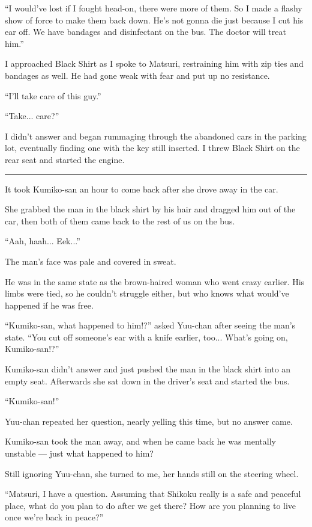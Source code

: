 ``I would've lost if I fought head-on, there were more of them. So I made a flashy show of force to make them back down. He's not gonna die just because I cut his ear off. We have bandages and disinfectant on the bus. The doctor will treat him.''

I approached Black Shirt as I spoke to Matsuri, restraining him with zip ties and bandages as well. He had gone weak with fear and put up no resistance.

``I'll take care of this guy.''

``Take... care?''

I didn't answer and began rummaging through the abandoned cars in the parking lot, eventually finding one with the key still inserted. I threw Black Shirt on the rear seat and started the engine.

\vspace{\baselineskip}
\hrule
\vspace{\baselineskip}

It took Kumiko-san an hour to come back after she drove away in the car.

She grabbed the man in the black shirt by his hair and dragged him out of the car, then both of them came back to the rest of us on the bus.

``Aah, haah... Eek...''

The man's face was pale and covered in sweat.

He was in the same state as the brown-haired woman who went crazy earlier. His limbs were tied, so he couldn't struggle either, but who knows what would've happened if he was free.

``Kumiko-san, what happened to him!?'' asked Yuu-chan after seeing the man's state.  ``You cut off someone's ear with a knife earlier, too... What's going on, Kumiko-san!?''

Kumiko-san didn't answer and just pushed the man in the black shirt into an empty seat. Afterwards she sat down in the driver's seat and started the bus.

``Kumiko-san!''

Yuu-chan repeated her question, nearly yelling this time, but no answer came.

Kumiko-san took the man away, and when he came back he was mentally unstable --- just what happened to him?

Still ignoring Yuu-chan, she turned to me, her hands still on the steering wheel.

``Matsuri, I have a question. Assuming that Shikoku really is a safe and peaceful place, what do you plan to do after we get there? How are you planning to live once we're back in peace?''

